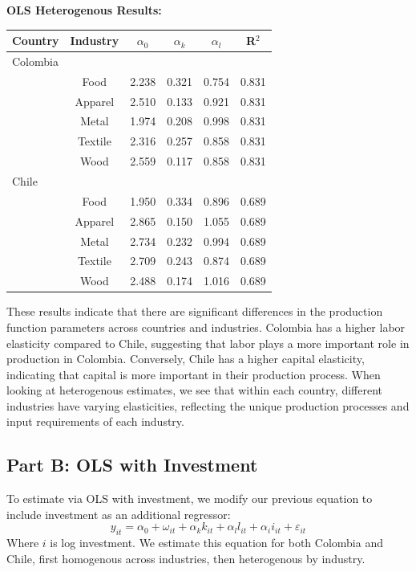 \documentclass{article}
\begin{document}
\vspace{1cm}
\textbf{OLS Heterogenous Results:}
\begin{center}
\begin{tabular}[h]{|lccccc|}
  \hline
  \textbf{Country} & \textbf{Industry} & \textbf{$\alpha_0$} & \textbf{$\alpha_k$} & \textbf{$\alpha_l$} & \textbf{R$^2$} \\
  \hline
  \hline
  Colombia & & & & & \\
  \hline
   & Food & 2.238 & 0.321 & 0.754 & 0.831 \\
   & Apparel & 2.510 & 0.133 & 0.921 & 0.831 \\
   & Metal & 1.974 & 0.208 & 0.998 & 0.831 \\
   & Textile & 2.316 & 0.257 & 0.858 & 0.831 \\
   & Wood & 2.559 & 0.117 & 0.858 & 0.831 \\
   \hline
  Chile & & & & & \\
  \hline
   & Food & 1.950 & 0.334 & 0.896 & 0.689 \\
   & Apparel & 2.865 & 0.150 & 1.055 & 0.689 \\
   & Metal & 2.734 & 0.232 & 0.994 & 0.689 \\
   & Textile & 2.709 & 0.243 & 0.874 & 0.689 \\
   & Wood & 2.488 & 0.174 & 1.016 & 0.689 \\
   \hline
\end{tabular}
\end{center}

These results indicate that there are significant differences in the production function parameters across countries and industries. Colombia has a higher labor
elasticity compared to Chile, suggesting that labor plays a more important role in production in Colombia. Conversely, Chile has a higher capital elasticity, 
indicating that capital is more important in their production process. When looking at heterogenous estimates, we see that within each country, different industries 
have varying elasticities, reflecting the unique production processes and input requirements of each industry.

\subsection*{Part B: OLS with Investment}

To estimate via OLS with investment, we modify our previous equation to include investment as an additional regressor:
\begin{equation}
  y_{it} = \alpha_0 + \omega_{it} + \alpha_k k_{it} + \alpha_l l_{it} + \alpha_i i_{it} + \varepsilon_{it}
\end{equation}
Where $i$ is log investment. We estimate this equation for both Colombia and Chile, first homogenous across industries, then heterogenous by industry.
\end{document}
